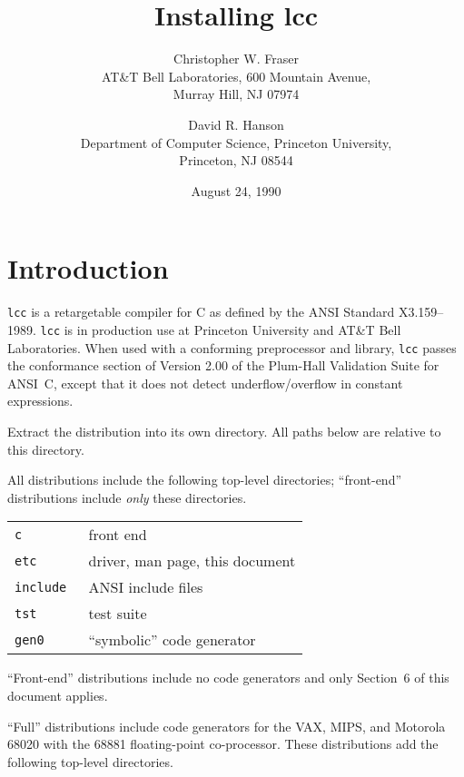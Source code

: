 
\title{Installing lcc}

\author{Christopher W. Fraser\\
AT\&T Bell Laboratories, 600 Mountain Avenue,\\
Murray Hill, NJ 07974
\and
David R. Hanson\\
Department of Computer Science, Princeton University,\\
Princeton, NJ 08544}

\date{August 24, 1990}



\maketitle

\section{Introduction}

\verb|lcc| is a retargetable compiler for C as defined
by the ANSI Standard X3.159--1989.
\verb|lcc| is in production use
at Princeton University and AT\&T Bell Laboratories.
When used with a conforming preprocessor and library,
\verb|lcc| passes the conformance section of Version 2.00 of the Plum-Hall
Validation Suite for ANSI~C, except that it
does not detect underflow/overflow in constant expressions.

Extract the distribution into its own directory.
All paths below are relative to this directory.

All distributions include the following top-level directories;
``front-end'' distributions include {\em only} these directories.

\begin{center}
\begin{tabular}{ll}
\tt c		& front end \\
\tt etc		& driver, man page, this document \\
\tt include	& ANSI include files \\
\tt tst		& test suite \\
\tt gen0	& ``symbolic'' code generator \\
\end{tabular}
\end{center}
``Front-end'' distributions include no code generators
and only Section~6 of this document applies.

``Full'' distributions include code generators for the VAX, MIPS,
and Motorola 68020 with the 68881 floating-point co-processor.
These distributions add the following top-level directories.

